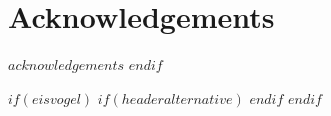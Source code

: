 \chapter*{Acknowledgements}
$acknowledgements$
$endif$






\cleardoublepage



$if(eisvogel)$
$if(headeralternative)$
    \pagestyle{headeralternative}
$endif$
$endif$
